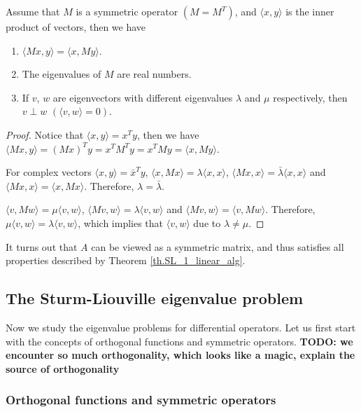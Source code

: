 \begin{theorem}[]\label{th.SL_1_linear_alg} Assume that $M$ is a symmetric operator $(M = M^{T})$, and $\langle x, y\rangle$ is the inner product of vectors, then we have
\begin{enumerate}
    \item $\langle M x, y\rangle = \langle x, My\rangle$.
    \item The eigenvalues of $M$ are real numbers.
    \item If $v$, $w$ are eigenvectors with different eigenvalues $\lambda$ and $\mu$ respectively, then $v\perp w$ $(\langle v, w\rangle = 0)$.
\end{enumerate}
\end{theorem}
\begin{proof}
    Notice that $\langle x, y\rangle = x^T y$, then we have $\langle M x, y\rangle = (M x)^T y = x^T M^T y = x^T M y = \langle x, My\rangle$.

    For complex vectors $\langle x, y\rangle = \bar{x}^T y$, $\langle x, M x\rangle = \lambda\langle x, x\rangle$, $\langle M x, x\rangle = \bar{\lambda}\langle x, x\rangle$ and $\langle M x, x\rangle = \langle x, Mx\rangle$. Therefore, $\lambda = \bar{\lambda}$. 

    $\langle v, M w\rangle = \mu\langle v, w\rangle$, $\langle M v, w\rangle = \lambda\langle v, w\rangle$ and $\langle M v, w\rangle = \langle v, Mw\rangle$. Therefore, $\mu\langle v, w\rangle = \lambda \langle v, w\rangle$, which implies that $\langle v, w\rangle$ due to $\lambda\neq\mu$.
\end{proof}


It turns out that $A$ can be viewed as a symmetric matrix, and thus satisfies all properties described by Theorem \ref{th.SL_1_linear_alg}.


\subsection{The Sturm-Liouville eigenvalue problem}

Now we study the eigenvalue problems for differential operators. Let us first start with the concepts of orthogonal functions and symmetric operators. \textbf{TODO: we encounter so much orthogonality, which looks like a magic, explain the source of orthogonality}

\subsubsection{Orthogonal functions and symmetric operators}

